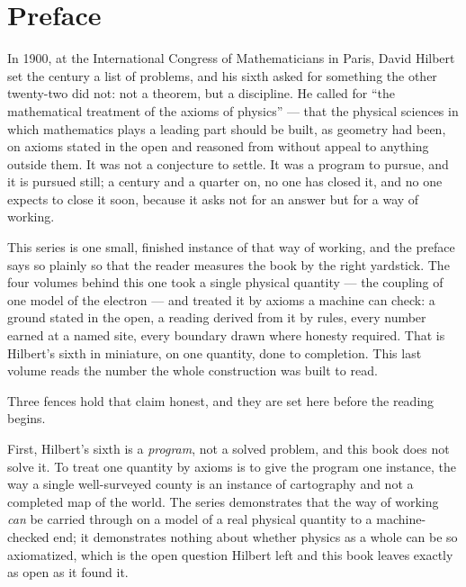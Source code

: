 \chapter*{Preface}

In 1900, at the International Congress of Mathematicians in Paris, David
Hilbert set the century a list of problems, and his sixth asked for
something the other twenty-two did not: not a theorem, but a discipline.
He called for ``the mathematical treatment of the axioms of physics'' ---
that the physical sciences in which mathematics plays a leading part
should be built, as geometry had been, on axioms stated in the open and
reasoned from without appeal to anything outside them. It was not a
conjecture to settle. It was a program to pursue, and it is pursued still;
a century and a quarter on, no one has closed it, and no one expects to
close it soon, because it asks not for an answer but for a way of working.

This series is one small, finished instance of that way of working, and
the preface says so plainly so that the reader measures the book by the
right yardstick. The four volumes behind this one took a single physical
quantity --- the coupling of one model of the electron --- and treated it
by axioms a machine can check: a ground stated in the open, a reading
derived from it by rules, every number earned at a named site, every
boundary drawn where honesty required. That is Hilbert's sixth in
miniature, on one quantity, done to completion. This last volume reads the
number the whole construction was built to read.

Three fences hold that claim honest, and they are set here before the
reading begins.

First, Hilbert's sixth is a \emph{program}, not a solved problem, and
this book does not solve it. To treat one quantity by axioms is to give
the program one instance, the way a single well-surveyed county is an
instance of cartography and not a completed map of the world. The series
demonstrates that the way of working \emph{can} be carried through on a
model of a real physical quantity to a machine-checked end; it demonstrates nothing
about whether physics as a whole can be so axiomatized, which is the open
question Hilbert left and this book leaves exactly as open as it found it.

